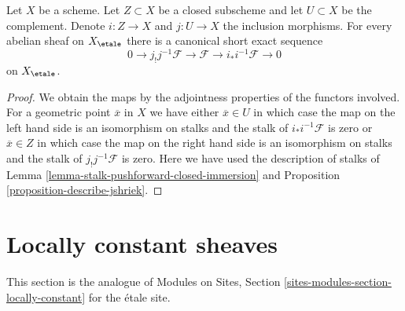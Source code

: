 \begin{lemma}
\label{lemma-ses-associated-to-open}
Let $X$ be a scheme. Let $Z \subset X$ be a closed subscheme and let
$U \subset X$ be the complement. Denote $i : Z \to X$ and $j : U \to X$
the inclusion morphisms. For every abelian sheaf on $X_\etale$
there is a canonical short exact sequence
$$
0 \to j_!j^{-1}\mathcal{F} \to \mathcal{F} \to i_*i^{-1}\mathcal{F} \to 0
$$
on $X_\etale$.
\end{lemma}

\begin{proof}
We obtain the maps by the adjointness properties of the functors
involved. For a geometric point $\overline{x}$ in $X$ we have either
$\overline{x} \in U$ in which case the map on the left hand side
is an isomorphism on stalks and the stalk of $i_*i^{-1}\mathcal{F}$
is zero or $\overline{x} \in Z$ in which case the map on the right hand side
is an isomorphism on stalks and the stalk of $j_!j^{-1}\mathcal{F}$
is zero. Here we have used the description of stalks of
Lemma \ref{lemma-stalk-pushforward-closed-immersion} and
Proposition \ref{proposition-describe-jshriek}.
\end{proof}








\section{Locally constant sheaves}
\label{section-locally-constant}

\noindent
This section is the analogue of
Modules on Sites, Section \ref{sites-modules-section-locally-constant}
for the \'etale site.

